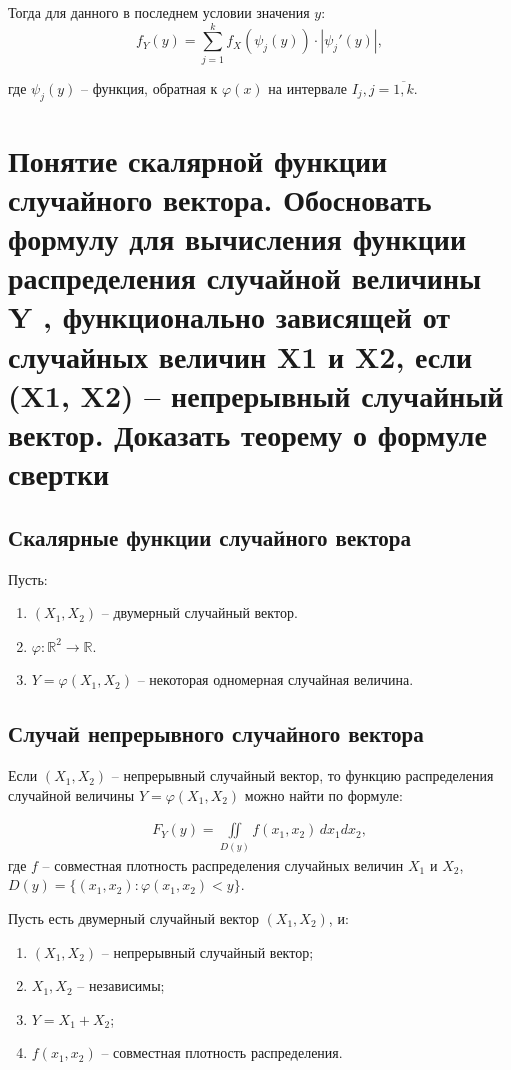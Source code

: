 Тогда для данного в последнем условии значения $y$:
\[
f_Y(y) = \sum_{j = 1}^{k} f_X (\psi_j(y)) \cdot |\psi_j'(y)|,
\]

где $\psi_j(y)$ -- функция, обратная к $\varphi(x)$ на интервале $I_j, j = \overline{1, k}$.

\section{Понятие скалярной функции случайного вектора. Обосновать формулу для вычисления функции распределения случайной величины Y , функционально зависящей от случайных величин X1 и X2, если (X1, X2) – непрерывный случайный вектор. Доказать теорему о формуле свертки}

\subsection*{Скалярные функции случайного вектора}

Пусть:
\begin{enumerate}
	\item $(X_1,X_2)$ -- двумерный случайный вектор.
	\item $\varphi: \mathbb{R}^2 \to \mathbb{R}$.
	\item $Y = \varphi(X_1, X_2)$ -- некоторая одномерная случайная величина.
\end{enumerate}

\subsection*{Случай непрерывного случайного вектора}

Если $(X_1, X_2)$ -- непрерывный случайный вектор, то функцию распределения случайной величины $Y = \varphi(X_1, X_2)$ можно найти по формуле:

\begin{align*}
	F_Y(y) = \iint\limits_{D(y)} f(x_1, x_2) \, dx_1 dx_2,
\end{align*}
где $f$ -- совместная плотность распределения случайных величин $X_1$ и $X_2$, $D(y) = \{(x_1, x_2):\varphi(x_1, x_2)<y\}$.

Пусть есть двумерный случайный вектор $(X_1, X_2)$, и:
\begin{enumerate}
	\item $(X_1, X_2)$ -- непрерывный случайный вектор;
	\item $X_1, X_2$ -- независимы;
	\item $Y = X_1 + X_2$;
	\item $f(x_1, x_2)$ -- совместная плотность распределения.
\end{enumerate}

